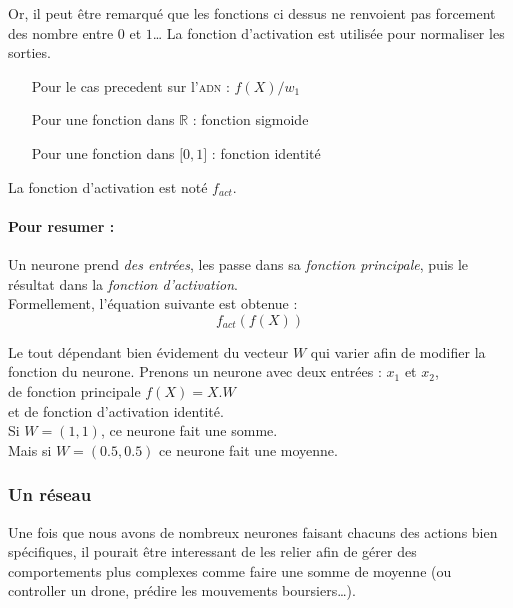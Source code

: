 Or, il peut être remarqué que les fonctions ci dessus ne renvoient pas forcement des nombre entre $0$ et $1$\ldots
La fonction d'activation est utilisée pour normaliser les sorties.
\exemle
{
\begin{itemize}
    \item[Pour le cas precedent sur l'\textsc{adn} :] $f(X)/w_1$
    \item[Pour une fonction dans $\mathbb{R}$ :] fonction sigmoide
    \item[Pour une fonction dans $[0, 1 \rbrack$ :] fonction identité
\end{itemize}
}
La fonction d'activation est noté $f_{act}$.


\paragraph{Pour resumer :}
Un neurone prend \textit{des entrées},
les passe dans sa \textit{fonction principale},
puis le résultat dans la \textit{fonction d'activation}. \\
Formellement, l'équation suivante est obtenue :
\begin{equation}
    f_{act}(f(X))
\end{equation}


Le tout dépendant bien évidement du vecteur $W$ qui varier afin de modifier la fonction du neurone.
\exemle
{
Prenons un neurone avec deux entrées : $x_1$ et $x_2$, \\
de fonction principale $f(X) = X.W$ \\
et de fonction d'activation identité. \\
Si $W = (1, 1)$, ce neurone fait une somme.\\
Mais si $W = (0.5, 0.5)$ ce neurone fait une moyenne.
}


\subsubsection{Un réseau}
Une fois que nous avons de nombreux neurones faisant chacuns des actions bien spécifiques,
il pourait être interessant de les relier afin de gérer des comportements plus complexes
comme faire une somme de moyenne (ou controller un drone, prédire les mouvements boursiers\ldots).

